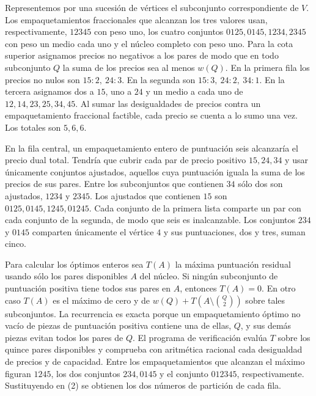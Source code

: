 \documentclass[spanish,11pt,a4paper]{article}
\begin{document}
Representemos por una sucesión de vértices el subconjunto correspondiente de \(V\). Los empaquetamientos fraccionales que alcanzan los tres valores usan, respectivamente, \(12345\) con peso uno, los cuatro conjuntos \(0125,0145,1234,2345\) con peso un medio cada uno y el núcleo completo con peso uno. Para la cota superior asignamos precios no negativos a los pares de modo que en todo subconjunto \(Q\) la suma de los precios sea al menos \(w(Q)\). En la primera fila los precios no nulos son \(15:2,\ 24:3\). En la segunda son \(15:3,\ 24:2,\ 34:1\). En la tercera asignamos dos a \(15\), uno a \(24\) y un medio a cada uno de \(12,14,23,25,34,45\). Al sumar las desigualdades de precios contra un empaquetamiento fraccional factible, cada precio se cuenta a lo sumo una vez. Los totales son \(5,6,6\).

En la fila central, un empaquetamiento entero de puntuación seis alcanzaría el precio dual total. Tendría que cubrir cada par de precio positivo \(15,24,34\) y usar únicamente conjuntos ajustados, aquellos cuya puntuación iguala la suma de los precios de sus pares. Entre los subconjuntos que contienen \(34\) sólo dos son ajustados, \(1234\) y \(2345\). Los ajustados que contienen \(15\) son \(0125,0145,1245,01245\). Cada conjunto de la primera lista comparte un par con cada conjunto de la segunda, de modo que seis es inalcanzable. Los conjuntos \(234\) y \(0145\) comparten únicamente el vértice \(4\) y sus puntuaciones, dos y tres, suman cinco.

Para calcular los óptimos enteros sea \(T(A)\) la máxima puntuación residual usando sólo los pares disponibles \(A\) del núcleo. Si ningún subconjunto de puntuación positiva tiene todos sus pares en \(A\), entonces \(T(A)=0\). En otro caso \(T(A)\) es el máximo de cero y de \(w(Q)+T(A\setminus\binom Q2)\) sobre tales subconjuntos. La recurrencia es exacta porque un empaquetamiento óptimo no vacío de piezas de puntuación positiva contiene una de ellas, \(Q\), y sus demás piezas evitan todos los pares de \(Q\). El programa de verificación evalúa \(T\) sobre los quince pares disponibles y comprueba con aritmética racional cada desigualdad de precios y de capacidad. Entre los empaquetamientos que alcanzan el máximo figuran \(1245\), los dos conjuntos \(234,0145\) y el conjunto \(012345\), respectivamente. Sustituyendo en (2) se obtienen los dos números de partición de cada fila.
\end{document}
